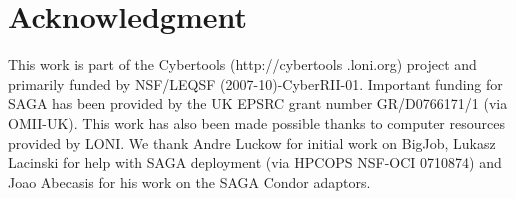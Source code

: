 \documentclass[conference,final]{IEEEtran}
\newcommand{\jhanote}[1]{ {\textcolor{red} { ***Jha: #1 }}}
\newcommand{\jhanote}[1]{}
\begin{document}


 




\section*{Acknowledgment}
This work is part of the Cybertools (http://cybertools .loni.org)
project and primarily funded by NSF/LEQSF (2007-10)-CyberRII-01.
Important funding for SAGA has been provided by the UK EPSRC grant
number GR/D0766171/1 (via OMII-UK). This work has also been made
possible thanks to computer resources provided by LONI. We thank Andre
Luckow for initial work on BigJob, Lukasz Lacinski for help with SAGA
deployment (via HPCOPS NSF-OCI 0710874) and Joao Abecasis for his work
on the SAGA Condor adaptors.

\nocite{ex1,ex2}
%


\end{document}
